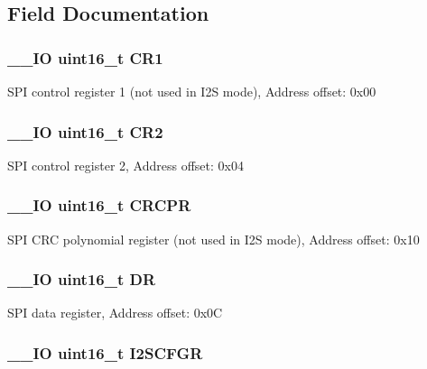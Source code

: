\subsection{Field Documentation}
\hypertarget{struct_s_p_i___type_def_a61400ce239355b62aa25c95fcc18a5e1}{
\subsubsection[{C\-R1}]{\setlength{\rightskip}{0pt plus 5cm}\-\_\-\-\_\-\-I\-O uint16\-\_\-t C\-R1}}\label{struct_s_p_i___type_def_a61400ce239355b62aa25c95fcc18a5e1}
S\-P\-I control register 1 (not used in I2\-S mode), Address offset\-: 0x00 \hypertarget{struct_s_p_i___type_def_a2a3e81bd118d1bc52d24a0b0772e6a0c}{
\subsubsection[{C\-R2}]{\setlength{\rightskip}{0pt plus 5cm}\-\_\-\-\_\-\-I\-O uint16\-\_\-t C\-R2}}\label{struct_s_p_i___type_def_a2a3e81bd118d1bc52d24a0b0772e6a0c}
S\-P\-I control register 2, Address offset\-: 0x04 \hypertarget{struct_s_p_i___type_def_a942ae09a7662bad70ef336f2bed43a19}{
\subsubsection[{C\-R\-C\-P\-R}]{\setlength{\rightskip}{0pt plus 5cm}\-\_\-\-\_\-\-I\-O uint16\-\_\-t C\-R\-C\-P\-R}}\label{struct_s_p_i___type_def_a942ae09a7662bad70ef336f2bed43a19}
S\-P\-I C\-R\-C polynomial register (not used in I2\-S mode), Address offset\-: 0x10 \hypertarget{struct_s_p_i___type_def_a0a1acc0425516ff7969709d118b96a3b}{
\subsubsection[{D\-R}]{\setlength{\rightskip}{0pt plus 5cm}\-\_\-\-\_\-\-I\-O uint16\-\_\-t D\-R}}\label{struct_s_p_i___type_def_a0a1acc0425516ff7969709d118b96a3b}
S\-P\-I data register, Address offset\-: 0x0\-C \hypertarget{struct_s_p_i___type_def_acb40abca5ca4cd2b2855adf2186effe8}{
\subsubsection[{I2\-S\-C\-F\-G\-R}]{\setlength{\rightskip}{0pt plus 5cm}\-\_\-\-\_\-\-I\-O uint16\-\_\-t I2\-S\-C\-F\-G\-R}}\label{struct_s_p_i___type_def_acb40abca5ca4cd2b2855adf2186effe8}
